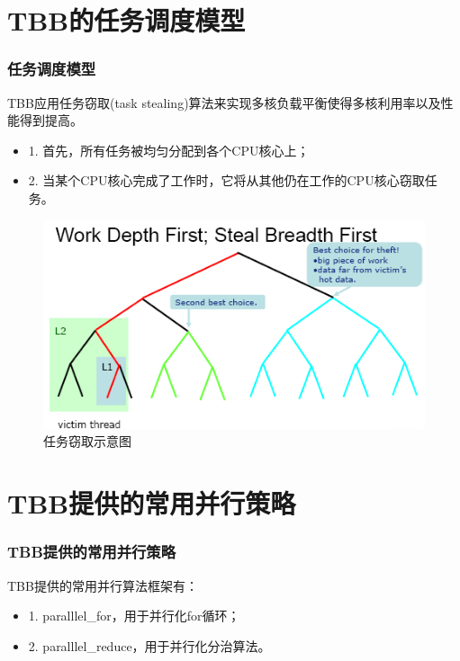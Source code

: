 \documentclass[hyperref={unicode},13pt,a4paper]{beamer}
\begin{document}
\begin{CJK*}{UTF8}{song}
\section{TBB的任务调度模型}
\begin{frame}
	\frametitle{任务调度模型}
	TBB应用任务窃取(task stealing)算法来实现多核负载平衡使得多核利用率以及性能得到提高。
	\begin{itemize}
	\item 1. 首先，所有任务被均匀分配到各个CPU核心上；
	\item 2. 当某个CPU核心完成了工作时，它将从其他仍在工作的CPU核心窃取任务。
	\end{itemize}
	\begin{figure}
	\centering
	\includegraphics[width=0.7\linewidth]{tbbsteal}
	\caption[任务窃取示意图]{任务窃取示意图} 
	\label{fig:tbbsteal}
	\end{figure}	
\end{frame}

\section{TBB提供的常用并行策略}
\begin{frame}
	\frametitle{TBB提供的常用并行策略}
	TBB提供的常用并行算法框架有：
	\begin{itemize}
	\item 1. paralllel\_for，用于并行化for循环；
	\item 2. paralllel\_reduce，用于并行化分治算法。
	\end{itemize}	
\end{frame}


\end{CJK*}
\end{document}
